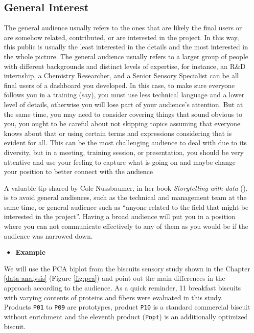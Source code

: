 \documentclass[
]{krantz}
\providecommand{\tightlist}{%
  \setlength{\itemsep}{0pt}\setlength{\parskip}{0pt}}
\begin{document}
\hypertarget{general-interest}{%
\subsection{General Interest}\label{general-interest}}

The general audience usually refers to the ones that are likely the final users or are somehow related, contributed, or are interested in the project. In this way, this public is usually the least interested in the details and the most interested in the whole picture. The general audience usually refers to a larger group of people with different backgrounds and distinct levels of expertise, for instance, an R\&D internship, a Chemistry Researcher, and a Senior Sensory Specialist can be all final users of a dashboard you developed. In this case, to make sure everyone follows you in a training (say), you must use less technical language and a lower level of details, otherwise you will lose part of your audience's attention. But at the same time, you may need to consider covering things that sound obvious to you, you ought to be careful about not skipping topics assuming that everyone knows about that or using certain terms and expressions considering that is evident for all. This can be the most challenging audience to deal with due to its diversity, but in a meeting, training session, or presentation, you should be very attentive and use your feeling to capture what is going on and maybe change your position to better connect with the audience

A valuable tip shared by Cole Nussbaumer, in her book \emph{Storytelling with data} (\citet{Knaflic2015}), is to avoid general audiences, such as the technical and management team at the same time, or general audience such as ``anyone related to the field that might be interested in the project''. Having a broad audience will put you in a position where you can not communicate effectively to any of them as you would be if the audience was narrowed down.

\begin{itemize}
\tightlist
\item
  \textbf{Example}
\end{itemize}

We will use the PCA biplot from the biscuits sensory study shown in the Chapter \ref{data-analysis} (Figure \ref{fig:pca}) and point out the main differences in the approach according to the audience. As a quick reminder, 11 breakfast biscuits with varying contents of proteins and fibers were evaluated in this study. Products \texttt{P01} to \texttt{P09} are prototypes, product \texttt{P10} is a standard commercial biscuit without enrichment and the eleventh product (\texttt{Popt}) is an additionally optimized biscuit.
\end{document}
